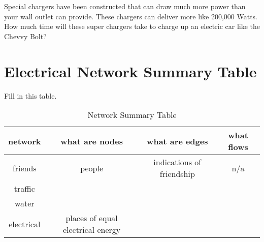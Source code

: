 \begin{blevel}
Special chargers have been constructed that can draw much more power than your wall outlet can provide. These chargers can deliver more like 200,000 Watts. How much time will these super chargers take to charge up an electric car like the Chevvy Bolt?
\end{blevel}


\section{Electrical Network Summary Table}

\begin{blevel}
Fill in this table.
\end{blevel}

\par
\begin{table}[H]
\begin{center}
\begin{tabular}{ |c | c | c | c |} \hline
network	&	what are nodes	& what are edges	& what flows \\ \hline
friends	&	people	& indications of friendship	& n/a \\ \hline
traffic &		&				&	\\ \hline
water	&		&				&	\\ \hline
electrical	& places of equal electrical energy	&	&	\\ \hline
\end{tabular}
\caption{Network Summary Table}
\end{center}
\end{table}

